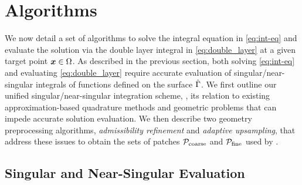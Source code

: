 \section{Algorithms\label{sec:algo}}

We now detail a set of algorithms to solve the integral equation in \cref{eq:int-eq} and evaluate the solution via the double layer integral in \cref{eq:double_layer} at a given target point ${\bm{x}} \in \Omega$.
As described in the previous section, both solving \cref{eq:int-eq} and evaluating \cref{eq:double_layer} require accurate evaluation of singular/near-singular integrals of functions defined on the surface $\hat{\Gamma}$.
We first outline our unified singular/near-singular integration scheme, \qbkix, its relation to existing approximation-based quadrature methods and geometric problems that can impede accurate solution evaluation.
We then describe two geometry preprocessing algorithms, \textit{admissibility refinement} and \textit{adaptive upsampling}, that address these issues to obtain the sets of patches ${\mathcal{P}_{\mathrm{coarse}}}$ and ${\mathcal{P}_{\mathrm{fine}}}$ used by \qbkix.

\subsection{Singular and Near-Singular Evaluation \label{sec:singular-eval}}

